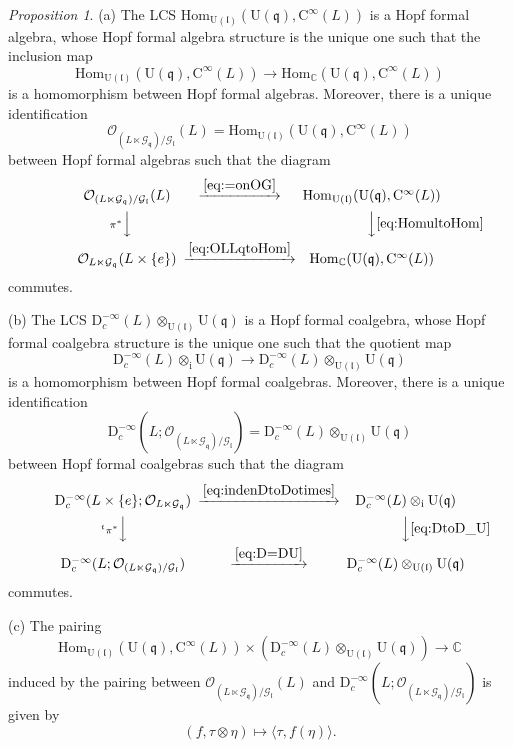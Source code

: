 \documentclass[12pt, a4paper]{amsart}
\newcommand{\BC}{{\mathbb {C}}}
\newcommand{\CG}{{\mathcal {G}}}
\newcommand{\CO}{{\mathcal {O}}}
\newcommand{\RC}{{\mathrm {C}}}
\newcommand{\RD}{{\mathrm {D}}}
\newcommand{\Ri}{{\mathrm{i}}}
\newcommand{\RU}{{\mathrm {U}}}
\newcommand{\Hom}{{\mathrm{Hom}}}
\newcommand{\q}{\mathfrak q}
\renewcommand{\l}{\mathfrak l}
\newcommand{\be}{\begin {equation}}
\newcommand{\ee}{\end {equation}}
\theoremstyle{Theorem}
\theoremstyle{Theorem}
\theoremstyle{Theorem}
\theoremstyle{Theorem}
\theoremstyle{Plain}
\theoremstyle{remark}
\theoremstyle{remark}
\theoremstyle{Definition}
\newtheorem{prpd}[dfn]{Proposition}
\numberwithin{equation}{section}
\begin{document}
\begin{prpd}\label{prop:OofLLqLl}
\noindent (a) The LCS $\Hom_{\RU(\l)}(\RU(\q),\RC^{\infty}(L))$ is a Hopf formal algebra, whose Hopf formal algebra structure is the unique one such that the inclusion map 
\be\label{eq:HomultoHom}
\Hom_{\RU(\l)}(\RU(\q),\RC^{\infty}(L)) \rightarrow \Hom_{\BC}(\RU(\q),\RC^{\infty}(L))
\ee 
is a homomorphism between Hopf formal algebras. Moreover, there is a unique identification 
\be\label{eq:=onOG}
\CO_{(L\ltimes \CG_{\q})/\CG_{\l}}(L)
   =\Hom_{\RU(\l)}(\RU(\q),\RC^{\infty}(L))
\ee 
between Hopf formal algebras such that the diagram 
\[
\begin{CD}
    \CO_{(L\ltimes \CG_{\q})/\CG_{\l}}(L) @>\eqref{eq:=onOG}>> \Hom_{\RU(\l)}(\RU(\q),\RC^{\infty}(L)) \\
    @V\pi^*VV @VV\eqref{eq:HomultoHom}V \\
    \CO_{L\ltimes \CG_{\q}}(L\times\{e\}) @>\eqref{eq:OLLqtoHom}>> \Hom_{\BC}(\RU(\q),\RC^{\infty}(L))
\end{CD}
\]
commutes.

\noindent (b) The LCS $\RD^{-\infty}_c(L)\otimes_{\RU(\l)}\RU(\q)$ is a Hopf formal coalgebra, whose Hopf formal coalgebra structure is the unique one such that the quotient map
\be \label{eq:DtoD_U}
\RD^{-\infty}_c(L)\otimes_{\Ri}\RU(\q)
   \longrightarrow
   \RD^{-\infty}_c(L)\otimes_{\RU(\l)}\RU(\q)
\ee
is a homomorphism between Hopf formal coalgebras. Moreover, there is a unique identification
\be\label{eq:D=DU}
\RD^{-\infty}_c(L;\CO_{(L\ltimes \CG_{\q})/\CG_{\l}})
   =\RD^{-\infty}_c(L)\otimes_{\RU(\l)}\RU(\q)
\ee
between Hopf formal coalgebras such that the diagram 
\[
\begin{CD}
    \RD^{-\infty}_c(L\times\{e\};\CO_{L\ltimes \CG_{\q}}) @>\eqref{eq:indenDtoDotimes}>> \RD^{-\infty}_c(L)\otimes_{\Ri}\RU(\q) \\
    @V{}^t\pi^*VV @VV\eqref{eq:DtoD_U}V \\
    \RD^{-\infty}_c(L;\CO_{(L\ltimes \CG_{\q})/\CG_{\l}}) @>\eqref{eq:D=DU}>> \RD^{-\infty}_c(L)\otimes_{\RU(\l)}\RU(\q)
\end{CD}
\]
commutes.

\noindent (c) The pairing  
\[
\Hom_{\RU(\l)}(\RU(\q),\RC^{\infty}(L)) \times (\RD^{-\infty}_c(L)\otimes_{\RU(\l)}\RU(\q)) \rightarrow \BC
\]
induced by the pairing between $\CO_{(L\ltimes\CG_{\q})/\CG_{\l}}(L)$ and $\RD^{-\infty}_c(L;\CO_{(L\ltimes \CG_{\q})/\CG_{\l}})$ is given by
\be \label{eq:pairing2}
(f,\tau\otimes\eta) \mapsto \bigl\langle \tau,  f(\eta)  \bigr\rangle.
\ee
\end{prpd}
\end{document}
